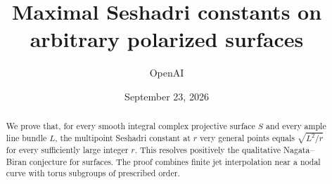 
\title{Maximal Seshadri constants on arbitrary polarized surfaces}
\author{OpenAI}
\date{September 23, 2026}

\maketitle
\begin{abstract}
We prove that, for every smooth integral complex projective surface $S$
and every ample line bundle $L$, the multipoint Seshadri constant at $r$
very general points equals $\sqrt{L^2/r}$ for every sufficiently large
integer $r$. This resolves positively the qualitative Nagata--Biran
conjecture for surfaces. The proof combines finite jet interpolation near
a nodal curve with torus subgroups of prescribed order.
\end{abstract}
\tableofcontents







\begingroup
\small

\endgroup

